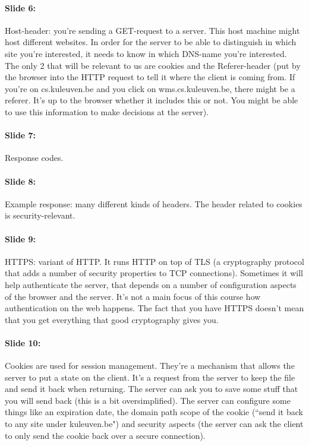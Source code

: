 \documentclass[10pt,a4paper]{report}
\begin{document}
\paragraph{Slide 6:} Host-header: you're sending a GET-request to a server. This host machine might host different websites. In order for the server to be able to distinguish in which site you're interested, it needs to know in which DNS-name you're interested. \\
The only 2 that will be relevant to us are cookies and the Referer-header (put by the browser into the HTTP request to tell it where the client is coming from. If you're on cs.kuleuven.be and you click on wms.cs.kuleuven.be, there might be a referer. It's up to the browser whether it includes this or not. You might be able to use this information to make decisions at the server).

\paragraph{Slide 7:} Response codes. 

\paragraph{Slide 8:} Example response: many different kinds of headers. The header related to cookies is security-relevant. 

\paragraph{Slide 9:} HTTPS: variant of HTTP. It runs HTTP on top of TLS (a cryptography protocol that adds a number of security properties to TCP connections). Sometimes it will help authenticate the server, that depends on a number of configuration aspects of the browser and the server. It's not a main focus of this course how authentication on the web happens. The fact that you have HTTPS doesn't mean that you get everything that good cryptography gives you. 

\paragraph{Slide 10:} Cookies are used for session management. They're a mechanism that allows the server to put a state on the client. It's a request from the server to keep the file and send it back when returning. The server can ask you to save some stuff that you will send back (this is a bit oversimplified). The server can configure some things like an expiration date, the domain path scope of the cookie (``send it back to any site under kuleuven.be") and security aspects (the server can ask the client to only send the cookie back over a secure connection).
\end{document}
